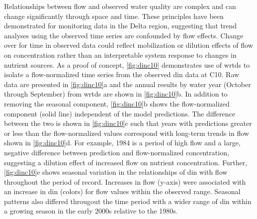 \documentclass[journal = esthag, manuscript = article]{achemso}\usepackage[]{graphicx}\usepackage[]{color}
\begin{document}
Relationships between flow and observed water quality are complex and can change significantly through space and time\cite{Hirsch10,Zhang16}. These principles have been demonstrated for monitoring data in the Delta region\cite{Jassby08,Novick15,Jabusch16}, suggesting that trend analyses using the observed time series are confounded by flow effects.  Change over for time in observed data could reflect mobilization or dilution effects of flow on concentration rather than an interpretable system response to changes in nutrient sources.  As a proof of concept, \cref{fig:dinc10} demonstrates use of \ac{wrtds} to isolate a flow-normalized time series from the observed \ac{din} data at C10. Raw data are presented in \cref{fig:dinc10}a and the annual results by water year (October through September) from \ac{wrtds} are shown in \cref{fig:dinc10}b. In addition to removing the seasonal component, \cref{fig:dinc10}b shows the flow-normalized component (solid line) independent of the model predictions.  The difference between the two is shown in \cref{fig:dinc10}c such that years with predictions greater or less than the flow-normalized values correspond with long-term trends in flow shown in \cref{fig:dinc10}d.  For example, 1984 is a period of high flow and a large, negative difference between prediction and flow-normalized concentration, suggesting a dilution effect of increased flow on nutrient concentration.  Further, \cref{fig:dinc10}e shows seasonal variation in the relationships of \ac{din} with flow throughout the period of record. Increases in flow (y-axis) were associated with an increase in \ac{din} (colors) for flow values within the observed range.  Seasonal patterns also differed througout the time period with a wider range of \ac{din} within a growing season in the early 2000s relative to the 1980s. %
\end{document}
